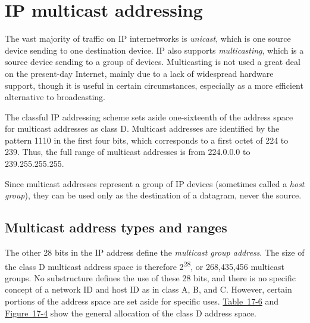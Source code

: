 \section{IP multicast addressing}

The vast majority of traffic on IP internetworks is {\emph{unicast}},
which is one source device sending to one destination device. IP also
supports { \emph{multicasting}}, which is a source device sending to a
group of devices. Multicasting is not used a great deal on the
present-day Internet, mainly due to a lack of widespread hardware
support, though it is useful in certain circumstances, especially as a
more efficient alternative to
broadcasting.\protect\hypertarget{ch17s06.htmlux5cux23idx-CHP-17-0707}{}{}

The classful IP addressing scheme sets aside one-sixteenth of the
address space for
\protect\hypertarget{ch17s06.htmlux5cux23idx-CHP-17-0708}{}{}multicast
addresses as class D. Multicast addresses are identified by the pattern
1110 in the first four bits, which corresponds to a first octet of 224
to 239. Thus, the full range of multicast addresses is from 224.0.0.0 to
239.255.255.255.

Since multicast addresses represent a group of IP devices (sometimes
called a {\emph{host group}}), they can be used only as the destination
of a datagram, never the source.



\subsection{Multicast address types and ranges}

The other 28 bits in the IP address define the {\emph{multicast group
address}}. The size of the class D multicast address space is therefore
2\textsuperscript{28}, or 268,435,456 multicast
\protect\hypertarget{ch17s06.htmlux5cux23idx-CHP-17-0709}{}{}groups. No
substructure defines the use of these 28 bits, and there is no specific
concept of a network ID and host ID as in class A, B, and C. However,
certain portions of the address space are set aside for specific uses.
\protect\hyperlink{ch17s06.htmlux5cux23ip_multicast_address_ranges_and_uses}{Table~17-6}
and
\protect\hyperlink{ch17s06.htmlux5cux23ip_multicast_address_ranges_and_uses_all}{Figure~17-4}
show the general allocation of the class D address
space.\protect\hypertarget{ch17s06.htmlux5cux23idx-CHP-17-0710}{}{}\protect\hypertarget{ch17s06.htmlux5cux23idx-CHP-17-0711}{}{}


